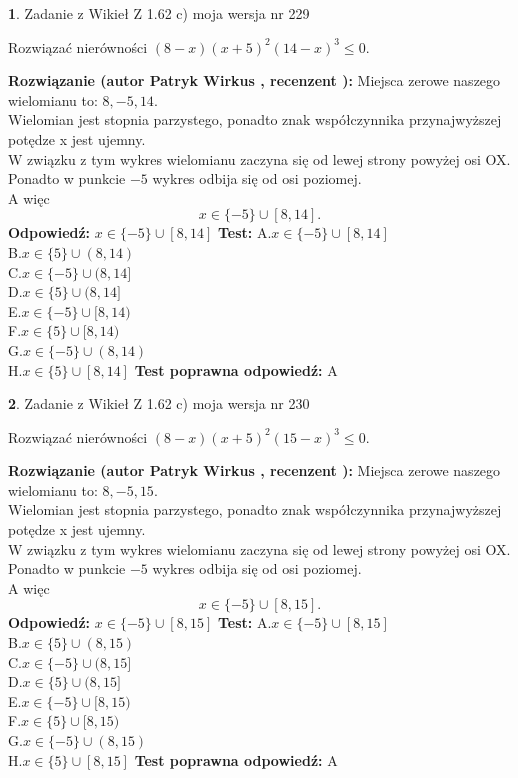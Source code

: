 \documentclass[12pt, a4paper]{article}
\theoremstyle{definition} %
\newtheorem{zad}{}
\newcommand{\zadStart}[1]{\begin{zad}#1\newline}
\newcommand{\zadStop}{\end{zad}}
\newcommand{\rozwStart}[2]{\noindent \textbf{Rozwiązanie (autor #1 , recenzent #2): }\newline}
\newcommand{\rozwStop}{\newline}
\newcommand{\odpStart}{\noindent \textbf{Odpowiedź:}\newline}
\newcommand{\odpStop}{\newline}
\newcommand{\testStart}{\noindent \textbf{Test:}\newline}
\newcommand{\testStop}{\newline}
\newcommand{\kluczStart}{\noindent \textbf{Test poprawna odpowiedź:}\newline}
\newcommand{\kluczStop}{\newline}
\begin{document}
\zadStart{Zadanie z Wikieł Z 1.62 c) moja wersja nr 229}

Rozwiązać nierówności $(8-x)(x+5)^{2}(14-x)^{3}\le0$.
\zadStop
\rozwStart{Patryk Wirkus}{}
Miejsca zerowe naszego wielomianu to: $8, -5, 14$.\\
Wielomian jest stopnia parzystego, ponadto znak współczynnika przy\linebreak najwyższej potędze x jest ujemny.\\ W związku z tym wykres wielomianu zaczyna się od lewej strony powyżej osi OX.\\
Ponadto w punkcie $-5$ wykres odbija się od osi poziomej.\\
A więc $$x \in \{-5\} \cup [8,14].$$
\rozwStop
\odpStart
$x \in \{-5\} \cup [8,14]$
\odpStop
\testStart
A.$x \in \{-5\} \cup [8,14]$\\
B.$x \in \{5\} \cup (8,14)$\\
C.$x \in \{-5\} \cup (8,14]$\\
D.$x \in \{5\} \cup (8,14]$\\
E.$x \in \{-5\} \cup [8,14)$\\
F.$x \in \{5\} \cup [8,14)$\\
G.$x \in \{-5\} \cup (8,14)$\\
H.$x \in \{5\} \cup [8,14]$
\testStop
\kluczStart
A
\kluczStop



\zadStart{Zadanie z Wikieł Z 1.62 c) moja wersja nr 230}

Rozwiązać nierówności $(8-x)(x+5)^{2}(15-x)^{3}\le0$.
\zadStop
\rozwStart{Patryk Wirkus}{}
Miejsca zerowe naszego wielomianu to: $8, -5, 15$.\\
Wielomian jest stopnia parzystego, ponadto znak współczynnika przy\linebreak najwyższej potędze x jest ujemny.\\ W związku z tym wykres wielomianu zaczyna się od lewej strony powyżej osi OX.\\
Ponadto w punkcie $-5$ wykres odbija się od osi poziomej.\\
A więc $$x \in \{-5\} \cup [8,15].$$
\rozwStop
\odpStart
$x \in \{-5\} \cup [8,15]$
\odpStop
\testStart
A.$x \in \{-5\} \cup [8,15]$\\
B.$x \in \{5\} \cup (8,15)$\\
C.$x \in \{-5\} \cup (8,15]$\\
D.$x \in \{5\} \cup (8,15]$\\
E.$x \in \{-5\} \cup [8,15)$\\
F.$x \in \{5\} \cup [8,15)$\\
G.$x \in \{-5\} \cup (8,15)$\\
H.$x \in \{5\} \cup [8,15]$
\testStop
\kluczStart
A
\kluczStop
\end{document}

